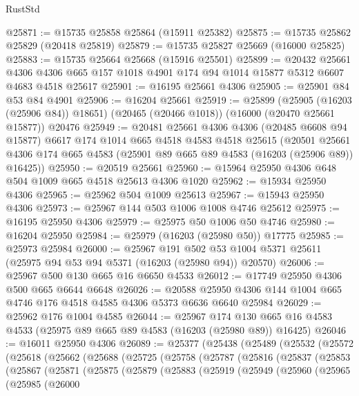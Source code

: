 \begin{lexlean}{RustStd}
\begin{coremodule}
@25871 := @15735 @25858 @25864 (@15911 @25382)
@25875 := @15735 @25862 @25829 (@20418 @25819)
@25879 := @15735 @25827 @25669 (@16000 @25825)
@25883 := @15735 @25664 @25668 (@15916 @25501)
@25899 := @20432
    @25661
    @4306
    @4306
    @665
    @157
    @1018
    @4901
    @174
    @94
    @1014
    @15877
    @5312
    @6607
    @4683
    @4518
    @25617
@25901 := @16195 @25661 @4306
@25905 := @25901 @84 @53 @84 @4901
@25906 := @16204 @25661
@25919 := @25899
    (@25905 (@16203 (@25906 @84)) @18651)
    (@20465 (@20466 @1018))
    (@16000 (@20470 @25661 @15877))
    @20476
@25949 := @20481
    @25661
    @4306
    @4306
    (@20485 @6608 @94 @15877)
    @6617
    @174
    @1014
    @665
    @4518
    @4583
    @4518
    @25615
    (@20501 @25661 @4306 @174 @665 @4583 (@25901 @89 @665 @89 @4583 (@16203 (@25906 @89)) @16425))
@25950 := @20519 @25661
@25960 := @15964 @25950 @4306 @648 @504 @1009 @665 @4518 @25613 @4306 @1020
@25962 := @15934 @25950 @4306
@25965 := @25962 @504 @1009 @25613
@25967 := @15943 @25950 @4306
@25973 := @25967 @144 @503 @1006 @1008 @4746 @25612
@25975 := @16195 @25950 @4306
@25979 := @25975 @50 @1006 @50 @4746
@25980 := @16204 @25950
@25984 := @25979 (@16203 (@25980 @50)) @17775
@25985 := @25973 @25984
@26000 := @25967
    @191
    @502
    @53
    @1004
    @5371
    @25611
    (@25975 @94 @53 @94 @5371 (@16203 (@25980 @94)) @20570)
@26006 := @25967 @500 @130 @665 @16 @6650 @4533
@26012 := @17749 @25950 @4306 @500 @665 @6644 @6648
@26026 := @20588 @25950 @4306 @144 @1004 @665 @4746 @176 @4518 @4585 @4306 @5373 @6636 @6640 @25984
@26029 := @25962 @176 @1004 @4585
@26044 := @25967
    @174
    @130
    @665
    @16
    @4583
    @4533
    (@25975 @89 @665 @89 @4583 (@16203 (@25980 @89)) @16425)
@26046 := @16011 @25950 @4306
@26089 := @25377
    (@25438
      (@25489
        (@25532
          (@25572
            (@25618
              (@25662
                (@25688
                  (@25725
                    (@25758
                      (@25787
                        (@25816
                          (@25837
                            (@25853
                              (@25867
                                (@25871
                                  (@25875
                                    (@25879
                                      (@25883
                                        (@25919
                                          (@25949
                                            (@25960
                                              (@25965
                                                (@25985
                                                  (@26000

\end{coremodule}
\end{lexlean}
